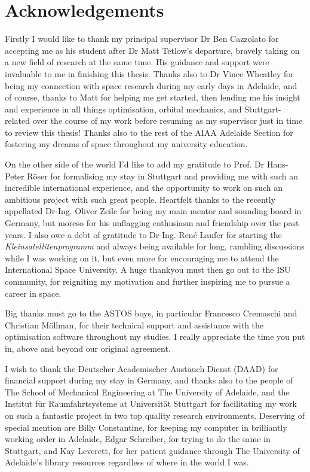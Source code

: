 \chapter*{Acknowledgements}

Firstly I would like to thank my principal supervisor Dr Ben Cazzolato for accepting me as his student after Dr Matt Tetlow's departure, bravely taking on a new field of research at the same time. His guidance and support were invaluable to me in finishing this thesis. Thanks also to Dr Vince Wheatley for being my connection with space research during my early days in Adelaide, and of course, thanks to Matt for helping me get started, then lending me his insight and experience in all things optimisation, orbital mechanics, and Stuttgart-related over the course of my work before resuming as my supervisor just in time to review this thesis! Thanks also to the rest of the AIAA Adelaide Section for fostering my dreams of space throughout my university education.

On the other side of the world I'd like to add my gratitude to Prof. Dr Hans-Peter R\"{o}ser for formalising my stay in Stuttgart and providing me with such an incredible international experience, and the opportunity to work on such an ambitious project with such great people. Heartfelt thanks to the recently appellated Dr-Ing. Oliver Zeile for being my main mentor and sounding board in Germany, but moreso for his unflagging enthusiasm and friendship over the past years. I also owe a debt of gratitude to Dr-Ing. Ren\'{e} Laufer for starting the \emph{Kleinsatellitenprogramm} and always being available for long, rambling discussions while I was working on it, but even more for encouraging me to attend the International Space University. A huge thankyou must then go out to the ISU community, for reigniting my motivation and further inspiring me to pursue a career in space.

Big thanks must go to the ASTOS boys, in particular Francesco Cremaschi and Christian M\"{o}llman, for their technical support and assistance with the optimisation software throughout my studies. I really appreciate the time you put in, above and beyond our original agreement.

I wish to thank the Deutscher Academischer Austauch Dienst (DAAD) for financial support during my stay in Germany, and thanks also to the people of The School of Mechanical Engineering at The University of Adelaide, and the Institut f\"{u}r Raumfahrtsysteme at Universit\"{a}t Stuttgart for facilitating my work on such a fantastic project in two top quality research environments. Deserving of special mention are Billy Constantine, for keeping my computer in brilliantly working order in Adelaide, Edgar Schreiber, for trying to do the same in Stuttgart, and Kay Leverett, for her patient guidance through The University of Adelaide's library resources regardless of where in the world I was.

